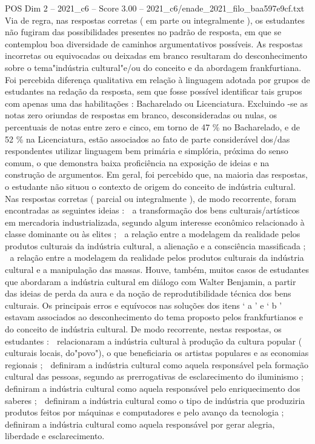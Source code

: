 \begin{textsample}{POS Dim 2 – 2021\_c6 – Score 3.00 – 2021\_c6/enade\_2021\_filo\_baa597e9cf.txt}
Via de regra, nas respostas corretas ( em parte ou integralmente ), os estudantes não fugiram das possibilidades presentes no padrão de resposta, em que se contemplou boa diversidade de caminhos argumentativos possíveis.
As respostas incorretas ou equivocadas ou deixadas em branco resultaram do desconhecimento sobre o tema"indústria cultural"e/ou do conceito e da abordagem frankfurtiana.
Foi percebida diferença qualitativa em relação à linguagem adotada por grupos de estudantes na redação da resposta, sem que fosse possível identificar tais grupos com apenas uma das habilitações : Bacharelado ou Licenciatura.
Excluindo -se as notas zero oriundas de respostas em branco, desconsideradas ou nulas, os percentuais de notas entre zero e cinco, em torno de 47 \% no Bacharelado, e de 52 \% na Licenciatura, estão associados ao fato de parte considerável dos/das respondentes utilizar linguagem bem primária e simplória, próxima do senso comum, o que demonstra baixa proficiência na exposição de ideias e na construção de argumentos.
Em geral, foi percebido que, na maioria das respostas, o estudante não situou o contexto de origem do conceito de indústria cultural.
Nas respostas corretas ( parcial ou integralmente ), de modo recorrente, foram encontradas as seguintes ideias :  a transformação dos bens culturais/artísticos em mercadoria industrializada, segundo algum interesse econômico relacionado à classe dominante ou às elites ;  a relação entre a modelagem da realidade pelos produtos culturais da indústria cultural, a alienação e a consciência massificada ;  a relação entre a modelagem da realidade pelos produtos culturais da indústria cultural e a manipulação das massas.
Houve, também, muitos casos de estudantes que abordaram a indústria cultural em diálogo com Walter Benjamin, a partir das ideias de perda da aura e da noção de reprodutibilidade técnica dos bens culturais.
Os principais erros e equívocos nas soluções dos itens ‘ a ’ e ‘ b ' estavam associados ao desconhecimento do tema proposto pelos frankfurtianos e do conceito de indústria cultural.
De modo recorrente, nestas respostas, os estudantes :  relacionaram a indústria cultural à produção da cultura popular ( culturais locais, do"povo"), o que beneficiaria os artistas populares e as economias regionais ;  definiram a indústria cultural como aquela responsável pela formação cultural das pessoas, segundo as prerrogativas de esclarecimento do iluminismo ;  definiram a indústria cultural como aquela responsável pelo enriquecimento dos saberes ;  definiram a indústria cultural como o tipo de indústria que produziria produtos feitos por máquinas e computadores e pelo avanço da tecnologia ;  definiram a indústria cultural como aquela responsável por gerar alegria, liberdade e esclarecimento.

\end{textsample}
